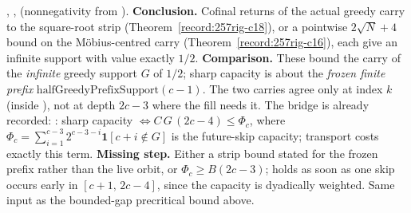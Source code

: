 \begin{obs}
,
,
(nonnegativity from
).
\textbf{Conclusion.} Cofinal returns of the actual greedy carry to the square-root strip
(Theorem~\ref{record:257rig-c18}), or a pointwise $2\sqrt N+4$ bound on the M\"obius-centred
carry (Theorem~\ref{record:257rig-c16}), each give an infinite support with value exactly $1/2$.
\textbf{Comparison.} These bound the carry of the \emph{infinite}
greedy support $G$ of $1/2$; sharp capacity is about the \emph{frozen
finite prefix} $\mathrm{halfGreedyPrefixSupport}(c{-}1)$. The two carries agree only at index $k$
(inside ),
not at depth $2c{-}3$ where the fill needs it. The bridge is already recorded:
:
sharp capacity $\Leftrightarrow \ensuremath{C}\,G\,(2c{-}4) \le \Phi_c$, where
$\Phi_c=\sum_{i=1}^{c-3}2^{c-3-i}\mathbf 1[c+i\notin G]$ is the future-skip capacity;
transport costs exactly this term.
\textbf{Missing step.} Either a strip bound stated for the frozen prefix rather than the live orbit,
or $\Phi_c \ge \ensuremath{B}(2c{-}3)$; holds as
soon as one skip occurs early in $[c{+}1,\,2c{-}4]$, since the capacity is dyadically weighted.
Same input as the bounded-gap precritical bound above.
\end{obs}

